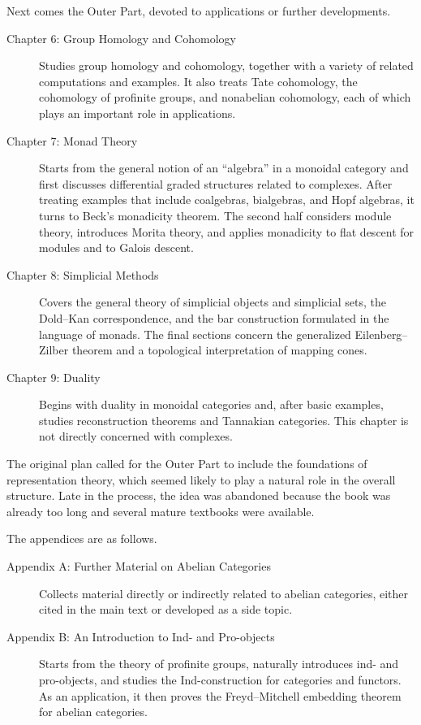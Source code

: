 Next comes the Outer Part, devoted to applications or further developments.
\begin{description}
	\item[Chapter 6: Group Homology and Cohomology] Studies group homology and cohomology, together with a variety of related computations and examples. It also treats Tate cohomology, the cohomology of profinite groups, and nonabelian cohomology, each of which plays an important role in applications.
	\item[Chapter 7: Monad Theory] Starts from the general notion of an ``algebra'' in a monoidal category and first discusses differential graded structures related to complexes. After treating examples that include coalgebras, bialgebras, and Hopf algebras, it turns to Beck's monadicity theorem. The second half considers module theory, introduces Morita theory, and applies monadicity to flat descent for modules and to Galois descent.
	\item[Chapter 8: Simplicial Methods] Covers the general theory of simplicial objects and simplicial sets, the Dold--Kan correspondence, and the bar construction formulated in the language of monads. The final sections concern the generalized Eilenberg--Zilber theorem and a topological interpretation of mapping cones.
	\item[Chapter 9: Duality] Begins with duality in monoidal categories and, after basic examples, studies reconstruction theorems and Tannakian categories. This chapter is not directly concerned with complexes.
\end{description}

The original plan called for the Outer Part to include the foundations of representation theory, which seemed likely to play a natural role in the overall structure. Late in the process, the idea was abandoned because the book was already too long and several mature textbooks were available.

The appendices are as follows.
\begin{description}
	\item[Appendix A: Further Material on Abelian Categories] Collects material directly or indirectly related to abelian categories, either cited in the main text or developed as a side topic.
	\item[Appendix B: An Introduction to Ind- and Pro-objects] Starts from the theory of profinite groups, naturally introduces ind- and pro-objects, and studies the Ind-construction for categories and functors. As an application, it then proves the Freyd--Mitchell embedding theorem for abelian categories.
\end{description}

